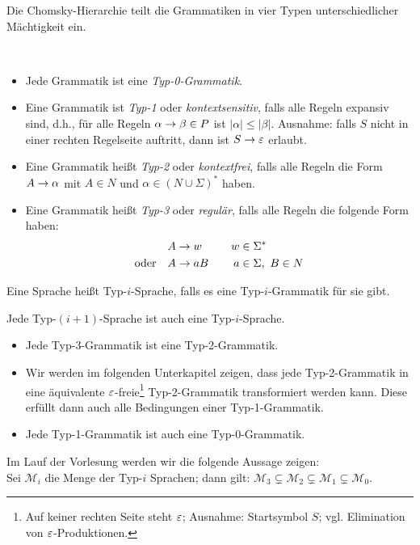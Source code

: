 \bigskip

Die Chomsky-Hierarchie teilt die Grammatiken in vier Typen unterschiedlicher Mächtigkeit ein.
\begin{Def}\
	\begin{itemize}
	\item Jede Grammatik ist eine \emph{Typ-0-Grammatik}.
	\item Eine Grammatik ist \emph{Typ-1} oder
          \emph{kontextsensitiv}, falls alle Regeln expansiv sind,
          d.h., für alle Regeln $\alpha\->\beta\in P$ ist
          $|\alpha|\leq |\beta|$. Ausnahme: falls $S$ nicht in einer
          rechten Regelseite auftritt, dann ist $S\->\Eps$ erlaubt. 
	\item Eine Grammatik heißt \emph{Typ-2} oder \emph{kontextfrei}, falls alle Regeln die Form $A\->\alpha$ mit $A\in N$ und $\alpha\in(N\cup\Sigma)^*$ haben.
	\item Eine Grammatik heißt \emph{Typ-3} oder \emph{regulär}, falls alle Regeln die folgende Form haben:
	\begin{alignat*}{2}
		&A\->w &\quad w&\in\Sigma^*\\
		\text{oder}\quad &A\->aB& a&\in\Sigma,\ B\in N
	\end{alignat*}
	\end{itemize}
	Eine Sprache heißt Typ-$i$-Sprache, falls es eine Typ-$i$-Grammatik für sie gibt.
\end{Def}

\begin{Beobachtung}\label{beob:3.ChomskyHierarchie}
	Jede Typ-$(i+1)$-Sprache ist auch eine Typ-$i$-Sprache.
\end{Beobachtung}
\begin{itemize}
 \item Jede Typ-3-Grammatik ist eine Typ-2-Grammatik.
 \item Wir werden im folgenden Unterkapitel zeigen, dass jede Typ-2-Grammatik in eine äquivalente $\varepsilon$-freie\footnote{Auf keiner rechten Seite steht $\varepsilon$; Ausnahme: Startsymbol $S$; vgl. Elimination von $\varepsilon$-Produktionen.} Typ-2-Grammatik transformiert werden kann.
 Diese erfüllt dann auch alle Bedingungen einer Typ-1-Grammatik.
 \item Jede Typ-1-Grammatik ist auch eine Typ-0-Grammatik.
\end{itemize}

Im Lauf der Vorlesung werden wir die folgende Aussage zeigen:\\
Sei $\mathcal{M}_i$ die Menge der Typ-$i$ Sprachen; dann gilt: 
$\mathcal{M}_3 \subsetneq \mathcal{M}_2 \subsetneq\mathcal{M}_1 \subsetneq\mathcal{M}_0$.





